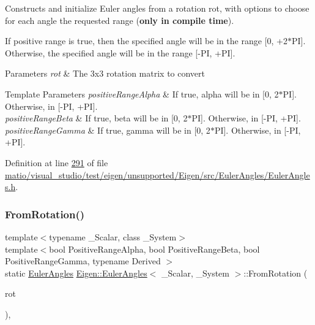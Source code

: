 Constructs and initialize Euler angles from a rotation {\ttfamily rot}, with options to choose for each angle the requested range ({\bfseries only in compile time}).

If positive range is true, then the specified angle will be in the range \mbox{[}0, +2$\ast$\+PI\mbox{]}. Otherwise, the specified angle will be in the range \mbox{[}-\/\+PI, +\+PI\mbox{]}.


\begin{DoxyParams}{Parameters}
{\em rot} & The 3x3 rotation matrix to convert \\
\hline
\end{DoxyParams}

\begin{DoxyTemplParams}{Template Parameters}
{\em positive\+Range\+Alpha} & If true, alpha will be in \mbox{[}0, 2$\ast$\+PI\mbox{]}. Otherwise, in \mbox{[}-\/\+PI, +\+PI\mbox{]}. \\
\hline
{\em positive\+Range\+Beta} & If true, beta will be in \mbox{[}0, 2$\ast$\+PI\mbox{]}. Otherwise, in \mbox{[}-\/\+PI, +\+PI\mbox{]}. \\
\hline
{\em positive\+Range\+Gamma} & If true, gamma will be in \mbox{[}0, 2$\ast$\+PI\mbox{]}. Otherwise, in \mbox{[}-\/\+PI, +\+PI\mbox{]}. \\
\hline
\end{DoxyTemplParams}


Definition at line \hyperlink{matio_2visual__studio_2test_2eigen_2unsupported_2_eigen_2src_2_euler_angles_2_euler_angles_8h_source_l00291}{291} of file \hyperlink{matio_2visual__studio_2test_2eigen_2unsupported_2_eigen_2src_2_euler_angles_2_euler_angles_8h_source}{matio/visual\+\_\+studio/test/eigen/unsupported/\+Eigen/src/\+Euler\+Angles/\+Euler\+Angles.\+h}.

\mbox{\label{class_eigen_1_1_euler_angles_aec5a08ed94b3574402d99850d766d18a}} 
\subsubsection{\texorpdfstring{From\+Rotation()}{FromRotation()}\hspace{0.1cm}{\footnotesize\ttfamily [4/4]}}
{\footnotesize\ttfamily template$<$typename \+\_\+\+Scalar, class \+\_\+\+System$>$ \\
template$<$bool Positive\+Range\+Alpha, bool Positive\+Range\+Beta, bool Positive\+Range\+Gamma, typename Derived $>$ \\
static \hyperlink{class_eigen_1_1_euler_angles}{Euler\+Angles} \hyperlink{class_eigen_1_1_euler_angles}{Eigen\+::\+Euler\+Angles}$<$ \+\_\+\+Scalar, \+\_\+\+System $>$\+::From\+Rotation (\begin{DoxyParamCaption}\item[{const \hyperlink{class_eigen_1_1_rotation_base}{Rotation\+Base}$<$ Derived, 3 $>$ \&}]{rot }\end{DoxyParamCaption})\hspace{0.3cm}{\ttfamily [inline]}, {\ttfamily [static]}}

